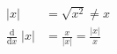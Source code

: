 \begin{equation}
\begin{split}
    \lvert x \rvert &= \sqrt{x^2} \neq x \\
    {\scriptscriptstyle \frac{\mathrm{d}}{\mathrm{d}x}}\; \lvert x \rvert &= \frac{x}{\lvert x \rvert} = \frac{\lvert x \rvert}{x}
\end{split}
\end{equation}